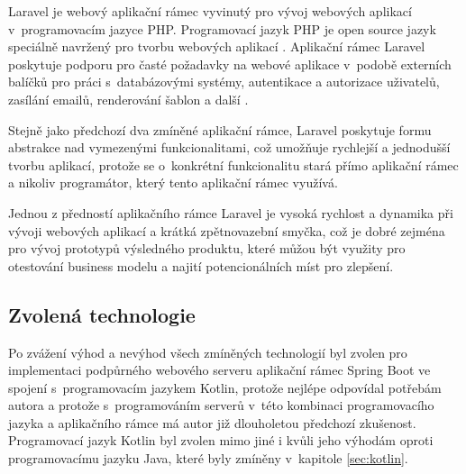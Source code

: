 Laravel je webový aplikační rámec vyvinutý pro vývoj webových aplikací v~programovacím jazyce PHP. Programovací jazyk PHP je open source jazyk speciálně navržený pro tvorbu webových aplikací \cite{what_is_php}. Aplikační rámec Laravel poskytuje podporu pro časté požadavky na webové aplikace v~podobě externích balíčků pro práci s~databázovými systémy, autentikace a autorizace uživatelů, zasílání emailů, renderování šablon a další \cite{laravel}. 

Stejně jako předchozí dva zmíněné aplikační rámce, Laravel poskytuje formu abstrakce nad vymezenými funkcionalitami, což umožňuje rychlejší a jednodušší tvorbu aplikací, protože se o~konkrétní funkcionalitu stará přímo aplikační rámec a nikoliv programátor, který tento aplikační rámec využívá.

Jednou z předností aplikačního rámce Laravel je vysoká rychlost a dynamika při vývoji webových aplikací a krátká zpětnovazební smyčka, což je dobré zejména pro vývoj prototypů výsledného produktu, které můžou být využity pro otestování business modelu a najití potencionálních míst pro zlepšení.

\subsection{Zvolená technologie}

Po zvážení výhod a nevýhod všech zmíněných technologií byl zvolen pro implementaci podpůrného webového serveru aplikační rámec Spring Boot ve spojení s~programovacím jazykem Kotlin, protože nejlépe odpovídal potřebám autora a protože s~programováním serverů v~této kombinaci programovacího jazyka a aplikačního rámce má autor již dlouholetou předchozí zkušenost. Programovací jazyk Kotlin byl zvolen mimo jiné i kvůli jeho výhodám oproti programovacímu jazyku Java, které byly zmíněny v~kapitole \ref{sec:kotlin}.